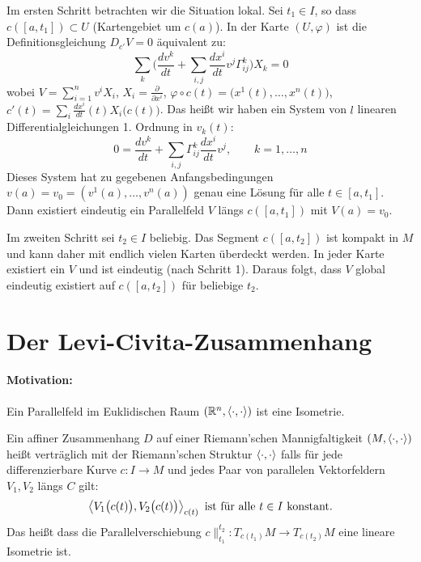 \documentclass[a4paper,twoside,DIV15,BCOR12mm]{scrbook}
\begin{document}
\begin{beweis}
Im ersten Schritt betrachten wir die Situation lokal. Sei $t_1\in I$, so dass $c([a,t_1]) \subset U$ (Kartengebiet um $c(a)$). In der Karte $(U,\varphi)$ ist die Definitionsgleichung $D_{c'}V=0$ äquivalent zu:
\[
\sum_k \bigg(\frac{dv^k}{dt} + \sum_{i,j} \frac{dx^i}{dt}v^j \Gamma_{ij}^k \bigg) X_k = 0
\]
wobei $V = \sum_{i=1}^n v^i X_i$, $X_i = \frac\partial{\partial x^i}$, $\varphi \circ c(t) = \big(x^1(t),\ldots,x^n(t)\big)$, $c'(t) = \sum_i \frac{dx^i}{dt}(t)X_i\big(c(t)\big)$. Das heißt wir haben ein System von $l$ linearen Differentialgleichungen 1. Ordnung in $v_k(t)$:
\[
0 = \frac{dv^k}{dt} + \sum_{i,j} \Gamma_{ij}^k \frac{dx^i}{dt} v^j, \qquad k=1,\ldots,n
\]
Dieses System hat zu gegebenen Anfangsbedingungen $v(a)=v_0 = (v^1(a),\ldots,v^n(a))$ genau eine Lösung für alle $t\in [a,t_1]$. Dann existiert eindeutig ein Parallelfeld $V$ längs $c([a,t_1])$ mit $V(a)=v_0$.

Im zweiten Schritt sei $t_2\in I$ beliebig. Das Segment $c([a,t_2])$ ist kompakt in $M$ und kann daher mit endlich vielen Karten überdeckt werden. In jeder Karte existiert ein $V$ und ist eindeutig (nach Schritt 1). Daraus folgt, dass $V$ global eindeutig existiert auf $c([a,t_2])$ für beliebige $t_2$.
\end{beweis}

\section{Der Levi-Civita-Zusammenhang}

\paragraph{Motivation:} Ein Parallelfeld im Euklidischen Raum $(\mathbb{R}^n,\langle\cdot,\cdot\rangle)$ ist eine Isometrie. 

\begin{definition}
Ein affiner Zusammenhang $D$ auf einer Riemann’schen Mannigfaltigkeit $(M,\langle\cdot,\cdot\rangle)$ heißt verträglich mit der Riemann’schen Struktur $\langle\cdot,\cdot\rangle$ falls für jede differenzierbare Kurve $c:I\to M$ und jedes Paar von parallelen Vektorfeldern $V_1,V_2$ längs $C$ gilt:
\[
\left\langle V_1\big(c(t)\big),V_2\big(c(t)\big)\right\rangle_{c(t)} \text{ ist für alle $t\in I$ konstant.}
\]
Das heißt dass die Parallelverschiebung $c\|_{t_1}^{t_2}: T_{c(t_1)}M \to T_{c(t_2)}M$ eine lineare Isometrie ist.
\end{definition}
\end{document}
